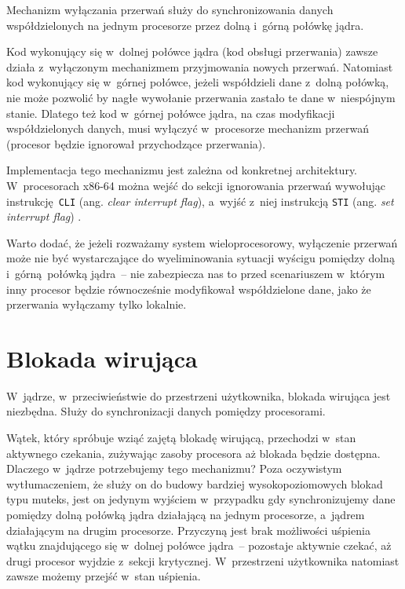 \documentclass[shortabstract]{iithesis}
\theoremstyle{definition} \newtheorem*{definition}{Definicja}
\theoremstyle{definition} \newtheorem*{example}{Przykład}
\theoremstyle{definition} \newtheorem*{remark}{Uwaga}
\begin{document}
Mechanizm wyłączania przerwań służy do synchronizowania danych współdzielonych na jednym procesorze przez
dolną i~górną połówkę jądra.

Kod wykonujący się w~dolnej połówce jądra (kod obsługi przerwania) zawsze działa
z~wyłączonym mechanizmem przyjmowania nowych przerwań. Natomiast kod wykonujący się w~górnej połówce, jeżeli
współdzieli dane z~dolną połówką, nie może pozwolić by nagłe wywołanie przerwania zastało te dane
w~niespójnym stanie. Dlatego też kod w~górnej połówce jądra, na czas modyfikacji współdzielonych danych,
musi wyłączyć w~procesorze mechanizm przerwań (procesor będzie ignorował przychodzące przerwania).

Implementacja tego mechanizmu jest zależna od konkretnej architektury.
W~procesorach x86-64 można wejść do sekcji ignorowania przerwań wywołując
instrukcję \texttt{CLI} (ang. \textit{clear interrupt flag}), a~wyjść z~niej
instrukcją \texttt{STI} (ang. \textit{set interrupt flag}) \cite{intel-sdm:vol2}.

Warto dodać, że jeżeli rozważamy system wieloprocesorowy, wyłączenie przerwań
może nie być wystarczające do wyeliminowania sytuacji wyścigu pomiędzy dolną i~górną połówką jądra~--
nie zabezpiecza nas to przed scenariuszem w~którym inny procesor będzie równocześnie
modyfikował współdzielone dane, jako że przerwania wyłączamy tylko lokalnie.

\section{Blokada wirująca}
\label{sec:kernel_spin}

W~jądrze, w~przeciwieństwie do przestrzeni użytkownika, blokada wirująca jest niezbędna. Służy do synchronizacji
danych pomiędzy procesorami.

Wątek, który spróbuje wziąć zajętą blokadę wirującą, przechodzi w~stan aktywnego czekania,
zużywając zasoby procesora aż blokada będzie dostępna. Dlaczego w~jądrze potrzebujemy tego mechanizmu?
Poza oczywistym wytłumaczeniem, że służy on do budowy bardziej wysokopoziomowych blokad typu muteks,
jest on jedynym wyjściem w~przypadku gdy synchronizujemy dane pomiędzy dolną połówką jądra działającą na jednym
procesorze, a~jądrem działającym na drugim procesorze. Przyczyną jest brak możliwości uśpienia wątku znajdującego
się w~dolnej połówce jądra~-- pozostaje aktywnie czekać, aż drugi procesor wyjdzie z~sekcji krytycznej.
W~przestrzeni użytkownika natomiast zawsze możemy przejść w~stan uśpienia.
\end{document}
